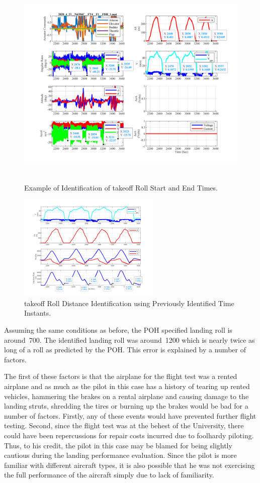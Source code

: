 \documentclass[conf]{new-aiaa}
\begin{document}
\begin{figure}[htp!]
\centering
	\includegraphics[height=4in]{LandingRollTimeID.png}
	\caption{Example of Identification of takeoff Roll Start and End Times.}
	\label{landingtimeid}
\end{figure}

\begin{figure}[htp!]
\centering
	\includegraphics[height=2in]{LandingRollDistID.png}
	\caption{takeoff Roll Distance Identification using Previously Identified Time Instants.}
	\label{landingdistanceid}
\end{figure}

Assuming the same conditions as before, the POH specified landing roll is around~\SI{700}{\foot}.  The identified landing roll was around~\SI{1200}{\foot} which is nearly twice as long of a roll as predicted by the POH. This error is explained by a number of factors.

The first of these factors is that the airplane for the flight test was a rented airplane and as much as the pilot in this case has a history of tearing up rented vehicles, hammering the brakes on a rental airplane and causing damage to the landing struts, shredding the tires or burning up the brakes would be bad for a number of factors. Firstly, any of these events would have prevented further flight testing. Second, since the flight test was at the behest of the University, there could have been repercussions for repair costs incurred due to foolhardy piloting. Thus, to his credit, the pilot in this case may be blamed for being slightly cautious during the landing performance evaluation.  Since the pilot is more familiar with different aircraft types, it is also possible that he was not exercising the full performance of the aircraft simply due to lack of familiarity.
\end{document}
